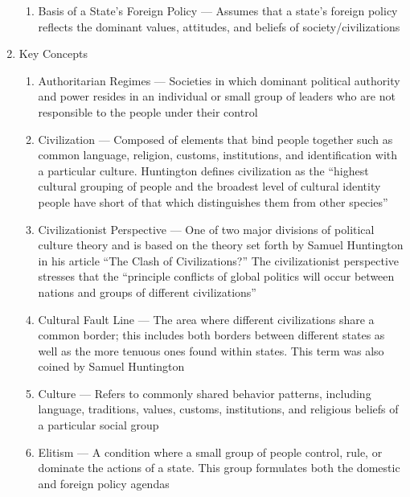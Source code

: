 \documentclass[12pt]{article}
\begin{document}
\begin{enumerate}
\begin{enumerate}
          \item Basis of a State's Foreign Policy — Assumes that a state’s foreign policy reflects the dominant values, attitudes, and beliefs of society/civilizations

        \end{enumerate}

      \item Key Concepts

        \begin{enumerate}

          \item Authoritarian Regimes — Societies in which dominant political authority and power resides in an individual or small group of leaders who are not responsible to the people under their control

          \item Civilization — Composed of elements that bind people together such as common language, religion, customs, institutions, and identification with a particular culture. Huntington defines civilization as the “highest cultural grouping of people and the broadest level of cultural identity people have short of that which distinguishes them from other species”

          \item Civilizationist Perspective — One of two major divisions of political culture theory and is based on the theory set forth by Samuel Huntington in his article “The Clash of Civilizations?” The civilizationist perspective stresses that the “principle conflicts of global politics will occur between nations and groups of different civilizations” 

          \item Cultural Fault Line — The area where different civilizations share a common border; this includes both borders between different states as well as the more tenuous ones found within states. This term was also coined by Samuel Huntington

          \item Culture — Refers to commonly shared behavior patterns, including language, traditions, values, customs, institutions, and religious beliefs of a particular social group

          \item Elitism — A condition where a small group of people control, rule, or dominate the actions of a state. This group formulates both the domestic and foreign policy agendas


\end{enumerate}
\end{enumerate}
\end{document}
